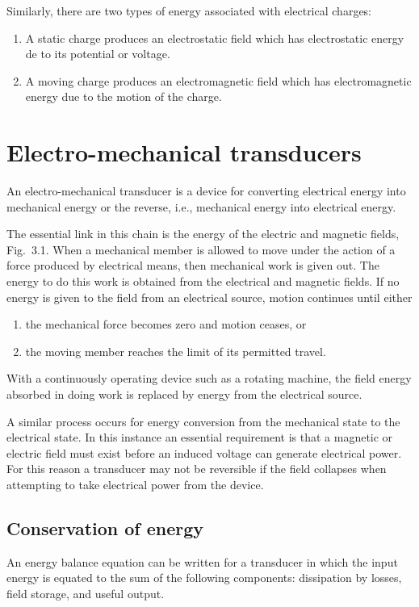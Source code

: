 \documentclass[a4paper,numbers=noenddot,12pt]{scrbook}
\begin{document}
            Similarly, there are two types of energy associated with electrical charges:
            \begin{enumerate}
                \item A static charge produces an electrostatic field which has electrostatic energy de to its potential or voltage.
                \item A moving charge produces an electromagnetic field which has electromagnetic energy due to the motion of the charge.
            \end{enumerate}

            \section{Electro-mechanical transducers}
            An electro-mechanical transducer is a device for converting electrical energy into mechanical energy or the reverse, i.e., mechanical energy into electrical energy.

            The essential link in this chain is the energy of the electric and magnetic fields, Fig.\ 3.1. When a mechanical member is allowed to move under the action of a force produced by electrical means, then mechanical work is given out. The energy to do this work is obtained from the electrical and magnetic fields. If no energy is given to the field from an electrical source, motion continues until either
            \begin{enumerate}
                \item the mechanical force becomes zero and motion ceases, or
                \item the moving member reaches the limit of its permitted travel.
            \end{enumerate}

            With a continuously operating device such as a rotating machine, the field energy absorbed in doing work is replaced by energy from the electrical source.

            A similar process occurs for energy conversion from the mechanical state to the electrical state. In this instance an essential requirement is that a magnetic or electric field must exist before an induced voltage can generate electrical power. For this reason a transducer may not be reversible if the field collapses when attempting to take electrical power from the device.

            \subsection{Conservation of energy}
            An energy balance equation can be written for a transducer in which the input energy is equated to the sum of the following components: dissipation by losses, field storage, and useful output.
\end{document}
